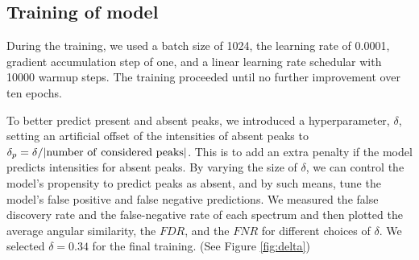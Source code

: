 \documentclass[10pt,a4paper]{article}
\begin{document}
\subsection*{Training of model}

During the training, we used a batch size of 1024, the learning rate of 0.0001, gradient accumulation step of one, and a linear learning rate schedular with 10000 warmup steps. The training proceeded until no further improvement over ten epochs.

To better predict present and absent peaks, we introduced a hyperparameter, $\delta$, setting an artificial offset of the intensities of absent peaks to $\delta_p =\delta / |\rm{number\ of\ considered\ peaks}|$. This is to add an extra penalty if the model predicts intensities for absent peaks. By varying the size of $\delta$, we can control the model’s propensity to predict peaks as absent, and by such means, tune the model’s false positive and false negative predictions. We measured the false discovery rate and the false-negative rate of each spectrum and then plotted the average angular similarity, the $\mathit{FDR}$, and the $\mathit{FNR}$ for different choices of $\delta$. We selected $\delta=0.34$ for the final training. (See Figure \ref{fig:delta})
\end{document}
